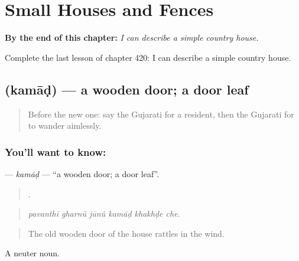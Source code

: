 
\chapter{Small Houses and Fences}
\label{ch:gu-small-houses-and-fences}

\begin{chapteropening}
\textbf{By the end of this chapter:} \emph{I can describe a simple country house.}

Complete the last lesson of chapter 420: I can describe a simple country house.
\end{chapteropening}

\section[\texorpdfstring{\gu{કમાડ} (kamāḍ)}{કમાડ (kamāḍ)}]{ (kamāḍ) — a wooden door; a door leaf}

\label{lesson:GU-C420-kamad}



\begin{quote}
Before the new one: say the Gujarati for a resident, then the Gujarati for to wander aimlessly.
\end{quote}

\subsection*{You'll want to know: }
\textbf{} — \emph{kamāḍ} — \textquotedblleft{}a wooden door; a door leaf\textquotedblright{}.

\begin{quote}
     .
\end{quote}

\begin{quote}
\emph{pavanthī gharnũ jūnũ kamāḍ khakhḍe che.}
\end{quote}

\begin{quote}
The old wooden door of the house rattles in the wind.
\end{quote}

A neuter noun.

